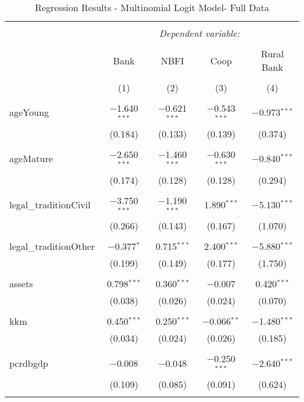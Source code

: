 \documentclass[a4paper,nobind]{templates/ociamthesis}
\begin{document}
\begin{table}[!htbp] \centering 
  \caption{Regression Results - Multinomial Logit Model- Full Data} 
  \label{} 
\footnotesize 
\begin{tabular}{@{\extracolsep{5pt}}lcccc} 
\\[-1.8ex]\hline 
\hline \\[-1.8ex] 
 & \multicolumn{4}{c}{\textit{Dependent variable:}} \\ 
\cline{2-5} 
\\[-1.8ex] & Bank & NBFI & Coop & Rural Bank \\ 
\\[-1.8ex] & (1) & (2) & (3) & (4)\\ 
\hline \\[-1.8ex] 
 ageYoung & $-$1.640$^{***}$ & $-$0.621$^{***}$ & $-$0.543$^{***}$ & $-$0.973$^{***}$ \\ 
  & (0.184) & (0.133) & (0.139) & (0.374) \\ 
  & & & & \\ 
 ageMature & $-$2.650$^{***}$ & $-$1.460$^{***}$ & $-$0.630$^{***}$ & $-$0.840$^{***}$ \\ 
  & (0.174) & (0.128) & (0.128) & (0.294) \\ 
  & & & & \\ 
 legal\_traditionCivil & $-$3.750$^{***}$ & $-$1.190$^{***}$ & 1.890$^{***}$ & $-$5.130$^{***}$ \\ 
  & (0.266) & (0.143) & (0.167) & (1.070) \\ 
  & & & & \\ 
 legal\_traditionOther & $-$0.377$^{*}$ & 0.715$^{***}$ & 2.400$^{***}$ & $-$5.880$^{***}$ \\ 
  & (0.199) & (0.149) & (0.177) & (1.750) \\ 
  & & & & \\ 
 assets & 0.798$^{***}$ & 0.360$^{***}$ & $-$0.007 & 0.420$^{***}$ \\ 
  & (0.038) & (0.026) & (0.024) & (0.070) \\ 
  & & & & \\ 
 kkm & 0.450$^{***}$ & 0.250$^{***}$ & $-$0.066$^{**}$ & $-$1.480$^{***}$ \\ 
  & (0.034) & (0.024) & (0.026) & (0.185) \\ 
  & & & & \\ 
 pcrdbgdp & $-$0.008 & $-$0.048 & $-$0.250$^{***}$ & $-$2.640$^{***}$ \\ 
  & (0.109) & (0.085) & (0.091) & (0.624) \\ 
  & & & & \\ 

\end{tabular}
\end{table}
\end{document}

